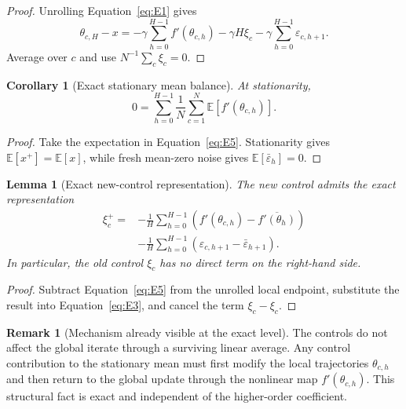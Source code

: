\documentclass[11pt]{article}
\newtheorem{lemma}[lemma]{Lemma}
\newtheorem{corollary}[corollary]{Corollary}
\theoremstyle{definition}
\newtheorem{remark}[remark]{Remark}
\newcommand{\E}{\mathbb{E}}
\newcommand{\eps}{\varepsilon}
\begin{document}
\begin{proof}
Unrolling Equation~\eqref{eq:E1} gives
\[
  \theta_{c,H}-x
  =-\gamma\sum_{h=0}^{H-1}f'(\theta_{c,h})
   -\gamma H\xi_c
   -\gamma\sum_{h=0}^{H-1}\eps_{c,h+1}.
\]
Average over $c$ and use $N^{-1}\sum_c\xi_c=0$.
\end{proof}

\begin{corollary}[Exact stationary mean balance]
\label{cor:stationary-mean-balance}
At stationarity,
\begin{equation}
\label{eq:stationary-mean-balance}
  0=\sum_{h=0}^{H-1}\frac1N\sum_{c=1}^N\E[f'(\theta_{c,h})].
\end{equation}
\end{corollary}

\begin{proof}
Take the expectation in Equation~\eqref{eq:E5}. Stationarity gives $\E[x^+]=\E[x]$, while fresh mean-zero noise gives $\E[\bar\eps_h]=0$.
\end{proof}

\begin{lemma}[Exact new-control representation]
\label{lem:control-representation}
The new control admits the exact representation
\begin{equation}
\label{eq:C6-1}
\begin{aligned}
  \xi_c^+
  ={}&-\frac1H\sum_{h=0}^{H-1}
  \left(f'(\theta_{c,h})-\overline{f'(\theta_h)}\right)\\
  &-\frac1H\sum_{h=0}^{H-1}
  \left(\eps_{c,h+1}-\bar\eps_{h+1}\right).
\end{aligned}
\end{equation}
In particular, the old control $\xi_c$ has no direct term on the right-hand side.
\end{lemma}

\begin{proof}
Subtract Equation~\eqref{eq:E5} from the unrolled local endpoint, substitute the result into Equation~\eqref{eq:E3}, and cancel the term $\xi_c-\xi_c$.
\end{proof}

\begin{remark}[Mechanism already visible at the exact level]
The controls do not affect the global iterate through a surviving linear average. Any control contribution to the stationary mean must first modify the local trajectories $\theta_{c,h}$ and then return to the global update through the nonlinear map $f'(\theta_{c,h})$. This structural fact is exact and independent of the higher-order coefficient.
\end{remark}
\end{document}
